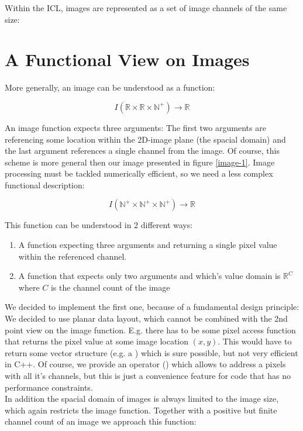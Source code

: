Within the ICL, images are represented as a set of image channels of the same size:



\section{A Functional View on Images\label{sec:the-image-function}}
More generally, an image can be understood as a function:

\begin{equation}
I(\mathbb{R} \times{} \mathbb{R} \times{} \mathbb{N^+} )\rightarrow\mathbb{R} 
\end{equation}

An image function expects three arguments: The first two arguments are referencing some location within the 2D-image plane (the spacial domain) and the last argument references a single channel from the image. Of course, this scheme is more general then our image presented in figure \ref{image-1}. Image processing must be tackled numerically efficient, so we need a less complex functional description:

\begin{equation}
  I(\mathbb{N^+} \times{} \mathbb{N^+} \times{} \mathbb{N^+} )\rightarrow\mathbb{R} 
\end{equation}


This function can be understood in 2 different ways:
\begin{enumerate}
 \item A function expecting three arguments and returning a single pixel value within the referenced channel.
 \item A function that expects only two arguments and which's value domain is $\mathbb{R}^C$ where $C$ is the channel count of the image
\end{enumerate} 

We decided to implement the first one, because of a fundamental design principle: We decided to use planar data layout, which cannot be combined with the 2nd point view on the image function. E.g. there has to be some pixel access function that returns the pixel value at some image location $(x,y)$. This would have to return some vector structure (e.g. a ) which is sure possible, but not very efficient in C++.
Of course, we provide an operator () which allows to address a pixels with all it's channels, but this is just a convenience feature for code that has no performance constraints.\\
In addition the spacial domain of images is always limited to the image size, which again restricts the image function. Together with a positive but finite channel count of an image we approach this function:

